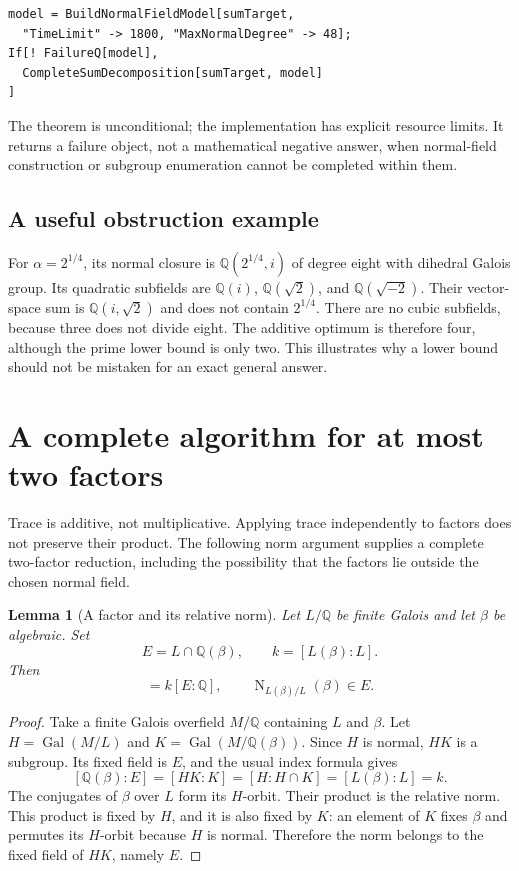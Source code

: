 \documentclass[11pt,a4paper]{article}
\newtheorem{lemma}[theorem]{Lemma}
\theoremstyle{definition}\newtheorem{definition}[theorem]{Definition}
\theoremstyle{remark}\newtheorem{remark}[theorem]{Remark}
\newcommand{\Q}{\mathbb{Q}}\newcommand{\C}{\mathbb{C}}
\newcommand{\Gal}{\operatorname{Gal}}
\newcommand{\Norm}{\operatorname{N}}
\begin{document}
\begin{lstlisting}
model = BuildNormalFieldModel[sumTarget,
  "TimeLimit" -> 1800, "MaxNormalDegree" -> 48];
If[! FailureQ[model],
  CompleteSumDecomposition[sumTarget, model]
]
\end{lstlisting}
The theorem is unconditional; the implementation has explicit resource limits. It returns a failure object, not a mathematical negative answer, when normal-field construction or subgroup enumeration cannot be completed within them.

\subsection{A useful obstruction example}
For $\alpha=2^{1/4}$, its normal closure is $\Q(2^{1/4},i)$ of degree eight with dihedral Galois group. Its quadratic subfields are $\Q(i)$, $\Q(\sqrt2)$, and $\Q(\sqrt{-2})$. Their vector-space sum is $\Q(i,\sqrt2)$ and does not contain $2^{1/4}$. There are no cubic subfields, because three does not divide eight. The additive optimum is therefore four, although the prime lower bound is only two. This illustrates why a lower bound should not be mistaken for an exact general answer.

\section{A complete algorithm for at most two factors}
\label{sec:binary}
Trace is additive, not multiplicative. Applying trace independently to factors does not preserve their product. The following norm argument supplies a complete two-factor reduction, including the possibility that the factors lie outside the chosen normal field.

\begin{lemma}[A factor and its relative norm]\label{lem:norm}
Let $L/\Q$ be finite Galois and let $\beta$ be algebraic. Set
\[
E=L\cap\Q(\beta),\qquad k=[L(\beta):L].
\]
Then
\begin{equation}
[\Q(\beta):\Q]=k[E:\Q],\qquad
\Norm_{L(\beta)/L}(\beta)\in E.\label{eq:normlemma}
\end{equation}
\end{lemma}
\begin{proof}
Take a finite Galois overfield $M/\Q$ containing $L$ and $\beta$. Let $H=\Gal(M/L)$ and $K=\Gal(M/\Q(\beta))$. Since $H$ is normal, $HK$ is a subgroup. Its fixed field is $E$, and the usual index formula gives
\[
[\Q(\beta):E]=[HK:K]=[H:H\cap K]=[L(\beta):L]=k.
\]
The conjugates of $\beta$ over $L$ form its $H$-orbit. Their product is the relative norm. This product is fixed by $H$, and it is also fixed by $K$: an element of $K$ fixes $\beta$ and permutes its $H$-orbit because $H$ is normal. Therefore the norm belongs to the fixed field of $HK$, namely $E$.\end{proof}
\end{document}
